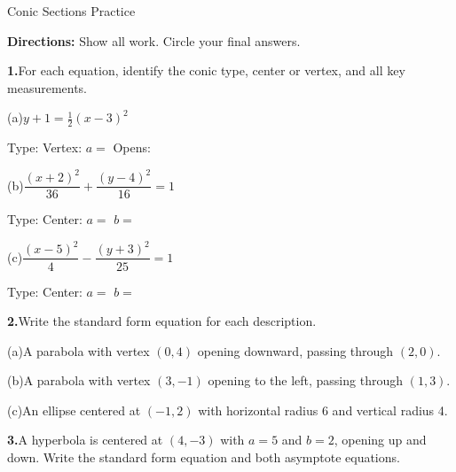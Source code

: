 \documentclass[10pt]{article}
\begin{document}
\namedateperiod

\vspace{0.10in}

\begin{notesbox}{Conic Sections Practice}

\textbf{Directions:} Show all work. Circle your final answers.

\vspace{8pt}
\textbf{1.}\quad For each equation, identify the conic type, center or vertex,
and all key measurements.

\vspace{4pt}
(a)\quad $y + 1 = \tfrac{1}{2}(x - 3)^2$

\vspace{4pt}
Type: \blank{2.5cm} \quad Vertex: \blank{3cm} \quad $a =$ \blank{1.5cm} \quad Opens: \blank{2cm}

\vspace{10pt}
(b)\quad $\dfrac{(x+2)^2}{36} + \dfrac{(y-4)^2}{16} = 1$

\vspace{4pt}
Type: \blank{2.5cm} \quad Center: \blank{3cm} \quad $a =$ \blank{1.5cm} \quad $b =$ \blank{1.5cm}

\vspace{10pt}
(c)\quad $\dfrac{(x-5)^2}{4} - \dfrac{(y+3)^2}{25} = 1$

\vspace{4pt}
Type: \blank{2.5cm} \quad Center: \blank{3cm} \quad $a =$ \blank{1.5cm} \quad $b =$ \blank{1.5cm}

\vspace{10pt}
\textbf{2.}\quad Write the standard form equation for each description.

\vspace{4pt}
(a)\quad A parabola with vertex $(0, 4)$ opening downward, passing through $(2, 0)$.


(b)\quad A parabola with vertex $(3, -1)$ opening to the left, passing through $(1, 3)$.


(c)\quad An ellipse centered at $(-1, 2)$ with horizontal radius 6 and vertical radius 4.


\vspace{6pt}
\textbf{3.}\quad A hyperbola is centered at $(4, -3)$ with $a = 5$ and $b = 2$, opening
up and down. Write the standard form equation and both asymptote equations.


\end{notesbox}
\end{document}
